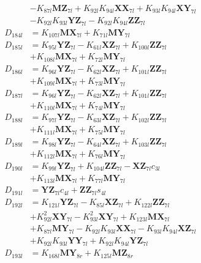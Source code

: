 \begin{multicols}{2}
\begin{align}
&- K_{87l}\mathbf{MZ}_{7l} + K_{92l}K_{94l}\mathbf{XX}_{7l} + K_{93l}K_{94l}\mathbf{XY}_{7l}  \nonumber \\
&- K_{92l}K_{93l}\mathbf{YZ}_{7l} - K_{92l}K_{94l}\mathbf{ZZ}_{7l} \nonumber \\
D_{184l} &= K_{107l}\mathbf{MX}_{7l} + K_{71l}\mathbf{MY}_{7l} \nonumber \\
D_{185l} &= K_{95l}\mathbf{YZ}_{7l} - K_{61l}\mathbf{XZ}_{7l} + K_{100l}\mathbf{ZZ}_{7l}  \nonumber \\
&+ K_{108l}\mathbf{MX}_{7l} + K_{72l}\mathbf{MY}_{7l} \nonumber \\
D_{186l} &= K_{96l}\mathbf{YZ}_{7l} - K_{62l}\mathbf{XZ}_{7l} + K_{101l}\mathbf{ZZ}_{7l}  \nonumber \\
&+ K_{109l}\mathbf{MX}_{7l} + K_{73l}\mathbf{MY}_{7l} \nonumber \\
D_{187l} &= K_{96l}\mathbf{YZ}_{7l} - K_{62l}\mathbf{XZ}_{7l} + K_{101l}\mathbf{ZZ}_{7l}  \nonumber \\
&+ K_{110l}\mathbf{MX}_{7l} + K_{74l}\mathbf{MY}_{7l} \nonumber \\
D_{188l} &= K_{97l}\mathbf{YZ}_{7l} - K_{63l}\mathbf{XZ}_{7l} + K_{102l}\mathbf{ZZ}_{7l}  \nonumber \\
&+ K_{111l}\mathbf{MX}_{7l} + K_{75l}\mathbf{MY}_{7l} \nonumber \\
D_{189l} &= K_{98l}\mathbf{YZ}_{7l} - K_{64l}\mathbf{XZ}_{7l} + K_{103l}\mathbf{ZZ}_{7l}  \nonumber \\
&+ K_{112l}\mathbf{MX}_{7l} + K_{76l}\mathbf{MY}_{7l} \nonumber \\
D_{190l} &= K_{99l}\mathbf{YZ}_{7l} + K_{104l}\mathbf{ZZ}_{7l} - \mathbf{XZ}_{7l}c_{3l}  \nonumber \\
&+ K_{113l}\mathbf{MX}_{7l} + K_{77l}\mathbf{MY}_{7l} \nonumber \\
D_{191l} &= \mathbf{YZ}_{7l}c_{4l} + \mathbf{ZZ}_{7l}s_{4l} \nonumber \\
D_{192l} &= K_{121l}\mathbf{YZ}_{7l} - K_{85l}\mathbf{XZ}_{7l} + K_{122l}\mathbf{ZZ}_{7l}  \nonumber \\
&+ K_{92l}^2\mathbf{XY}_{7l} - K_{93l}^2\mathbf{XY}_{7l} + K_{123l}\mathbf{MX}_{7l}  \nonumber \\
&+ K_{87l}\mathbf{MY}_{7l} - K_{92l}K_{93l}\mathbf{XX}_{7l} - K_{93l}K_{94l}\mathbf{XZ}_{7l}  \nonumber \\
&+ K_{92l}K_{93l}\mathbf{YY}_{7l} + K_{92l}K_{94l}\mathbf{YZ}_{7l} \nonumber \\
D_{193l} &= K_{168l}\mathbf{MY}_{8r} + K_{125l}\mathbf{MZ}_{8r} \nonumber \\

\end{align}
\end{multicols}
